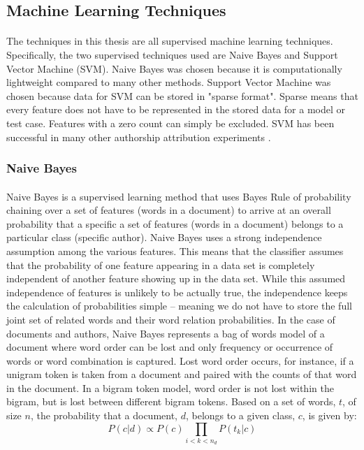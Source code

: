 	\subsection {Machine Learning Techniques}
		\paragraph{}The techniques in this thesis are all supervised machine learning techniques.  Specifically, the two supervised techniques used are Naive Bayes and Support Vector Machine (SVM).  Naive Bayes was chosen because it is computationally lightweight compared to many other methods.  Support Vector Machine was chosen because data for SVM can be stored in "sparse format".  Sparse means that every feature does not have to be represented in the stored data for a model or test case.  Features with a zero count can simply be excluded.  SVM has been successful in many other authorship attribution experiments \cite{jurafsky_speech_2009}.

		\subsubsection{Naive Bayes}
			\paragraph{} Naive Bayes is a supervised learning method that uses Bayes Rule of probability chaining over a set of features (words in a document) to arrive at an overall probability that a specific a set of features (words in a document) belongs to a particular class (specific author). Naive Bayes uses a strong independence assumption among the various features.  This means that the classifier assumes that the probability of one feature appearing in a data set is completely independent of another feature showing up in the data set.  While this assumed independence of features is unlikely to be actually true, the independence keeps the calculation of probabilities simple -- meaning we do not have to store the full joint set of related words and their word relation probabilities.  In the case of documents and authors, Naive Bayes represents a bag of words model of a document where word order can be lost and only frequency or occurrence of words or word combination is captured.  Lost word order occurs, for instance, if a unigram token is taken from a document and paired with the counts of that word in the document.  In a bigram token model, word order is not lost within the bigram, but is lost between different bigram tokens. Based on a set of words, $t$, of size $n$, the probability that a document, $d$, belongs to a given class, $c$, is given by:
				\begin{equation} P(c|d) \propto P(c) \prod_{i<k<n_d} P(t_k|c) \end{equation}


